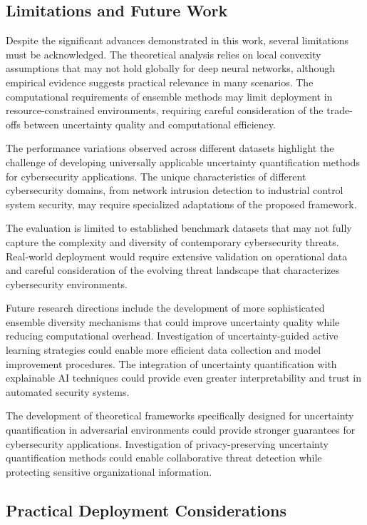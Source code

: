 \documentclass[journal]{IEEEtran}
\begin{document}
\subsection{Limitations and Future Work}

Despite the significant advances demonstrated in this work, several limitations must be acknowledged. The theoretical analysis relies on local convexity assumptions that may not hold globally for deep neural networks, although empirical evidence suggests practical relevance in many scenarios. The computational requirements of ensemble methods may limit deployment in resource-constrained environments, requiring careful consideration of the trade-offs between uncertainty quality and computational efficiency.

The performance variations observed across different datasets highlight the challenge of developing universally applicable uncertainty quantification methods for cybersecurity applications. The unique characteristics of different cybersecurity domains, from network intrusion detection to industrial control system security, may require specialized adaptations of the proposed framework.

The evaluation is limited to established benchmark datasets that may not fully capture the complexity and diversity of contemporary cybersecurity threats. Real-world deployment would require extensive validation on operational data and careful consideration of the evolving threat landscape that characterizes cybersecurity environments.

Future research directions include the development of more sophisticated ensemble diversity mechanisms that could improve uncertainty quality while reducing computational overhead. Investigation of uncertainty-guided active learning strategies could enable more efficient data collection and model improvement procedures. The integration of uncertainty quantification with explainable AI techniques could provide even greater interpretability and trust in automated security systems.

The development of theoretical frameworks specifically designed for uncertainty quantification in adversarial environments could provide stronger guarantees for cybersecurity applications. Investigation of privacy-preserving uncertainty quantification methods could enable collaborative threat detection while protecting sensitive organizational information.

\subsection{Practical Deployment Considerations}
\end{document}
